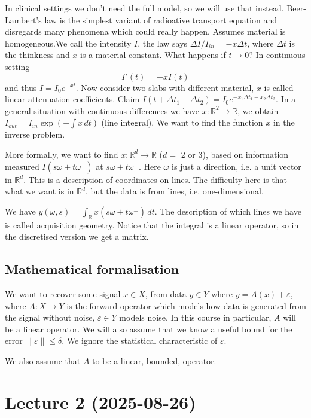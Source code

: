 \documentclass[12pt]{article}
\theoremstyle{definition}
\newcommand{\real}{\mathbb{R}}   %
\newcommand{\eps}{\varepsilon}    %
\newcommand\norm[1]{\left\lVert#1\right\rVert}
\begin{document}
In clinical settings we don't need the full model, so we will use that instead. Beer-Lambert's law is the simplest variant of radioative transport equation and disregards many phenomena which could really happen. Assumes material is homogeneous.We call the intensity $I$, the law says $\Delta I/I_{in} = - x\Delta t$, where $\Delta t$ is the thinkness and $x$ is a material constant. What happens if $t\to 0$? In continuous setting
\begin{equation*}
    I'(t) = -xI(t)
\end{equation*}
and thus $I= I_0e^{-xt}$. Now consider two slabs with different material, $x$ is called linear attenuation coefficients. Claim $I(t+\Delta t_1+\Delta t_2) = I_0e^{-x_1\Delta t_1 - x_2 \Delta t_2}$. In a general situation with continuous differences we have $x:\real^2\to\real$, we obtain $I_{out} = I_{in}\exp(-\int x \, dt)$ (line integral). We want to find the function $x$ in the inverse problem.

More formally, we want to find $x:\real^d\to\real$ ($d=$ 2 or 3), based on information measured $I(s\omega+t\omega^\perp)$ at $s\omega+t\omega^\perp$. Here $\omega$ is just a direction, i.e. a unit vector in $\real^d$. This is a description of coordinates on lines. The difficulty here is that what we want is in $\real^d$, but the data is from lines, i.e. one-dimensional.

We have $y(\omega,s) = \int_\real x(s\omega+t\omega^\perp) \, dt$. The description of which lines we have is called acquisition geometry. Notice that the integral is a linear operator, so in the discretised version we get a matrix. 

\subsection{Mathematical formalisation}
We want to recover some signal $x\in X$, from data $y\in Y$ where $y=A(x)+\eps$, where $A:X\to Y$ is the forward operator which models how data is generated from the signal without noise, $\eps\in Y$ models noise. In this course in particular, $A$ will be a linear operator. We will also assume that we know a useful bound for the error $\norm{\eps}\leq \delta$. We ignore the statistical characteristic of $\eps$.

We also assume that $A$ to be a linear, bounded, operator.

\newpage
\section{Lecture 2 (2025-08-26)}
\end{document}

